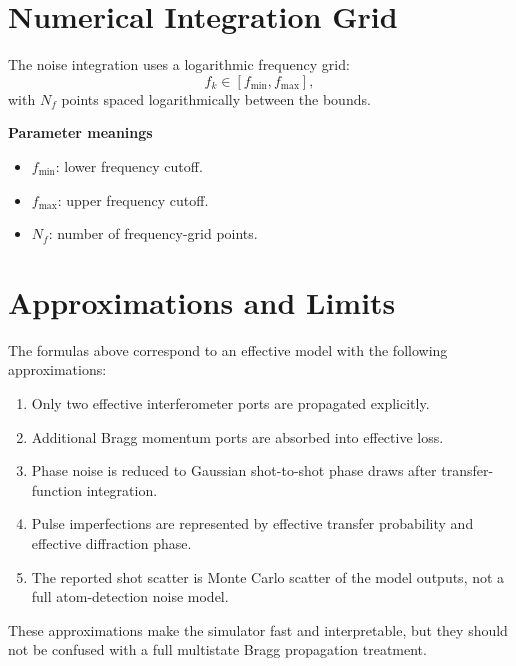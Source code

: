 \documentclass[11pt,a4paper]{article}
\begin{document}
\section{Numerical Integration Grid}

The noise integration uses a logarithmic frequency grid:
\begin{equation}
  f_k \in [f_{\min}, f_{\max}],
\end{equation}
with $N_f$ points spaced logarithmically between the bounds.

\textbf{Parameter meanings}
\begin{itemize}[leftmargin=1.5em]
  \item $f_{\min}$: lower frequency cutoff.
  \item $f_{\max}$: upper frequency cutoff.
  \item $N_f$: number of frequency-grid points.
\end{itemize}

\section{Approximations and Limits}

The formulas above correspond to an effective model with the following approximations:
\begin{enumerate}[leftmargin=1.8em]
  \item Only two effective interferometer ports are propagated explicitly.
  \item Additional Bragg momentum ports are absorbed into effective loss.
  \item Phase noise is reduced to Gaussian shot-to-shot phase draws after transfer-function integration.
  \item Pulse imperfections are represented by effective transfer probability and effective diffraction phase.
  \item The reported shot scatter is Monte Carlo scatter of the model outputs, not a full atom-detection noise model.
\end{enumerate}

These approximations make the simulator fast and interpretable, but they should not be confused with a full multistate Bragg propagation treatment.
\end{document}
